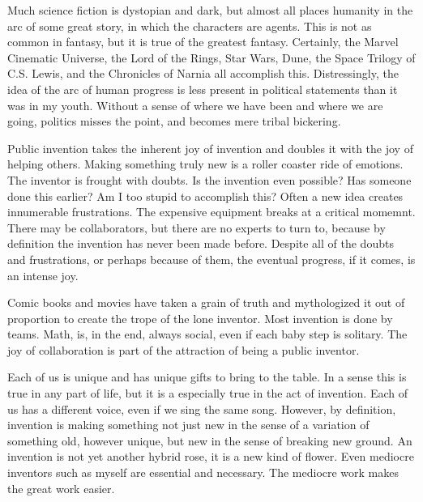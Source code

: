\documentclass[
	fontsize=10pt, %
	twoside=false, %
	secnumdepth=1, %
]{kaobook}
\begin{document}
Much science fiction is dystopian and dark, but almost all
places humanity in the arc of some great story,
in which the characters are agents.
This is not as common in fantasy, but it is true of the
greatest fantasy.
Certainly, the Marvel Cinematic Universe, the Lord of the Rings,
Star Wars, Dune, the Space Trilogy of C.S. Lewis,
and the Chronicles of Narnia all accomplish this.
Distressingly, the idea of the arc of human progress is
less present in political statements
than it was in my youth.
Without a sense of where we have been and where we are going,
politics misses the point, and becomes mere tribal bickering.

Public invention takes the inherent joy of invention and doubles
it with the joy of helping others.
Making something truly new is a roller coaster ride
of emotions.
The inventor is frought with doubts.
Is the invention even possible?
Has someone done this earlier?
Am I too stupid to accomplish this?
Often a new idea creates innumerable frustrations.
The expensive equipment breaks at a critical momemnt.
There may be collaborators,
but there are no experts to turn to, because by definition
the invention has never been made before.
Despite all of the doubts and frustrations, or
perhaps because of them, the eventual progress, if it
comes, is an intense joy.

Comic books and movies have taken a grain of truth
and mythologized it out of proportion to create the trope
of the lone inventor.
Most invention is done by teams.
Math, is, in the end, always social, even if each baby step is solitary.
The joy of collaboration is part of the attraction
of being a public inventor.

Each of us is unique and has unique gifts to bring
to the table.
In a sense this is true in any part of life,
but it is a especially true in the act of invention.
Each of us has a different voice, even if we sing
the same song.
However, by definition, invention is making something
not just new in the sense of a variation of something
old, however unique, but new in the sense of breaking new
ground.
An invention is not yet another hybrid rose, it is a new kind of flower.
Even mediocre inventors such as myself are essential and necessary.
The mediocre work makes the great work easier.
\end{document}
